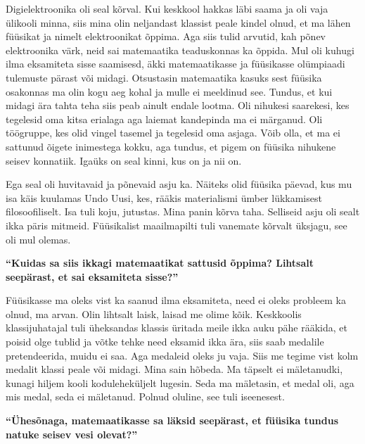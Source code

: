 Digielektroonika oli seal kõrval. Kui keskkool hakkas läbi saama ja oli vaja ülikooli minna, siis mina olin neljandast klassist peale kindel olnud, et ma lähen füüsikat ja nimelt elektroonikat õppima. Aga siis tulid arvutid, kah põnev elektroonika värk, neid sai matemaatika teaduskonnas ka õppida. Mul oli kuhugi ilma eksamiteta sisse saamisesd, äkki matemaatikasse ja füüsikasse olümpiaadi tulemuste pärast või midagi. Otsustasin matemaatika kasuks sest füüsika osakonnas ma olin kogu aeg kohal ja mulle ei meeldinud see. Tundus, et kui midagi ära tahta teha siis peab ainult endale lootma. Oli nihukesi saarekesi, kes tegelesid oma kitsa erialaga aga laiemat kandepinda ma ei märganud. Oli töögruppe, kes olid vingel tasemel ja tegelesid oma asjaga. Võib olla, et ma ei sattunud õigete inimestega kokku, aga tundus, et pigem on füüsika nihukene seisev konnatiik. Igaüks on seal kinni, kus on ja nii on. 

Ega seal oli huvitavaid ja põnevaid asju ka. Näiteks olid füüsika päevad, kus mu isa käis kuulamas Undo Uusi, kes, rääkis materialismi ümber lükkamisest filosoofiliselt. Isa tuli koju, jutustas. Mina panin kõrva taha. Selliseid asju oli sealt ikka päris mitmeid. Füüsikalist maailmapilti tuli vanemate kõrvalt üksjagu, see oli mul olemas. 

\textbf{\enquote{Kuidas sa siis ikkagi matemaatikat sattusid õppima? Lihtsalt seepärast, et sai eksamiteta sisse?}}

Füüsikasse ma oleks vist ka saanud ilma eksamiteta, need ei oleks probleem ka olnud, ma arvan. Olin lihtsalt laisk, laisad me olime kõik. Keskkoolis klassijuhatajal tuli üheksandas klassis üritada meile ikka auku pähe rääkida, et poisid olge tublid ja võtke tehke need eksamid ikka ära, siis saab medalile pretendeerida, muidu ei saa. Aga medaleid oleks ju vaja. Siis me tegime vist kolm medalit klassi peale või midagi. Mina sain hõbeda. Ma täpselt ei mäletanudki, kunagi hiljem kooli koduleheküljelt lugesin. Seda ma mäletasin, et medal oli, aga mis medal, seda ei mäletanud. Polnud oluline, see tuli iseenesest. 

\textbf{\enquote{Ühesõnaga, matemaatikasse sa läksid seepärast, et füüsika tundus natuke seisev vesi olevat?}}

